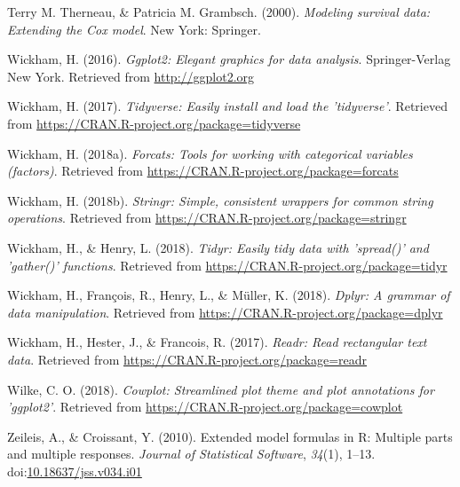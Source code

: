 \documentclass[man, fleqn, noextraspace]{apa6}
\theoremstyle{definition}
\theoremstyle{definition}
\theoremstyle{definition}
\theoremstyle{remark}
\begin{document}
\hypertarget{ref-R-survival-book}{}
Terry M. Therneau, \& Patricia M. Grambsch. (2000). \emph{Modeling
survival data: Extending the Cox model}. New York: Springer.

\hypertarget{ref-R-ggplot2}{}
Wickham, H. (2016). \emph{Ggplot2: Elegant graphics for data analysis}.
Springer-Verlag New York. Retrieved from \url{http://ggplot2.org}

\hypertarget{ref-R-tidyverse}{}
Wickham, H. (2017). \emph{Tidyverse: Easily install and load the
'tidyverse'}. Retrieved from
\url{https://CRAN.R-project.org/package=tidyverse}

\hypertarget{ref-R-forcats}{}
Wickham, H. (2018a). \emph{Forcats: Tools for working with categorical
variables (factors)}. Retrieved from
\url{https://CRAN.R-project.org/package=forcats}

\hypertarget{ref-R-stringr}{}
Wickham, H. (2018b). \emph{Stringr: Simple, consistent wrappers for
common string operations}. Retrieved from
\url{https://CRAN.R-project.org/package=stringr}

\hypertarget{ref-R-tidyr}{}
Wickham, H., \& Henry, L. (2018). \emph{Tidyr: Easily tidy data with
'spread()' and 'gather()' functions}. Retrieved from
\url{https://CRAN.R-project.org/package=tidyr}

\hypertarget{ref-R-dplyr}{}
Wickham, H., François, R., Henry, L., \& Müller, K. (2018). \emph{Dplyr:
A grammar of data manipulation}. Retrieved from
\url{https://CRAN.R-project.org/package=dplyr}

\hypertarget{ref-R-readr}{}
Wickham, H., Hester, J., \& Francois, R. (2017). \emph{Readr: Read
rectangular text data}. Retrieved from
\url{https://CRAN.R-project.org/package=readr}

\hypertarget{ref-R-cowplot}{}
Wilke, C. O. (2018). \emph{Cowplot: Streamlined plot theme and plot
annotations for 'ggplot2'}. Retrieved from
\url{https://CRAN.R-project.org/package=cowplot}

\hypertarget{ref-R-Formula}{}
Zeileis, A., \& Croissant, Y. (2010). Extended model formulas in R:
Multiple parts and multiple responses. \emph{Journal of Statistical
Software}, \emph{34}(1), 1--13.
doi:\href{https://doi.org/10.18637/jss.v034.i01}{10.18637/jss.v034.i01}

\endgroup
\end{document}
